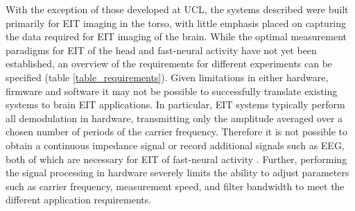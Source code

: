 With the exception of those developed at UCL, the systems described were built primarily for EIT imaging in the torso, with little emphasis placed on capturing the data required for EIT imaging of the brain. While the optimal measurement paradigms for EIT of the head and fast-neural activity have not yet been established, an overview of the requirements for different experiments can be specified (table \ref{table_requirements}). Given limitations in either hardware, firmware and software it may not be possible to successfully translate existing systems to brain EIT applications. In particular, EIT systems typically perform all demodulation in hardware, transmitting only the amplitude averaged over a chosen number of periods of the carrier frequency. Therefore it is not possible to obtain a continuous impedance signal or record additional signals such as EEG, both of which are necessary for EIT of fast-neural activity \cite{Aristovich_2016}. Further, performing the signal processing in hardware severely limits the ability to adjust parameters such as carrier frequency, measurement speed, and filter bandwidth to meet the different application requirements.